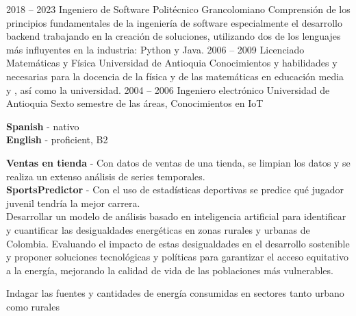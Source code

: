 \documentclass[9pt]{developercv} %
\begin{document}


\begin{entrylist}
	\entry
		{2018 -- 2023}
		{Ingeniero de Software}
		{Politécnico Grancolomiano}
		{Comprensión de los principios fundamentales de la ingeniería de software especialmente el desarrollo backend trabajando en la creación de soluciones, utilizando dos de los lenguajes más influyentes en la industria: Python y Java.}
	\entry
		{2006 -- 2009}
		{Licenciado Matemáticas y Física}
		{Universidad de Antioquia}
		{Conocimientos y habilidades y necesarias para la docencia de la física y de las matemáticas en educación media y , así como la universidad.  }
	\entry
		{2004 -- 2006}
		{Ingeniero electrónico}
		{Universidad de Antioquia }
		{Sexto semestre de las áreas, Conocimientos en IoT}
\end{entrylist}


\begin{minipage}[t]{0.4\textwidth}
	\vspace{-\baselineskip} %

	
	\textbf{Spanish} - nativo\\	
	\textbf{English} - proficient, B2\\
	
\end{minipage}
\hfill
\begin{minipage}[t]{0.4\textwidth}
	\vspace{-\baselineskip} %
	
	
	\textbf{Ventas en tienda} - Con datos de ventas de una tienda, se limpian los datos y se realiza un extenso análisis de series temporales. \\	
	
	\textbf{SportsPredictor} - Con el uso de estadísticas deportivas se predice qué jugador juvenil tendría la mejor carrera. \\
	
	Desarrollar un modelo de análisis basado en inteligencia artificial para identificar y cuantificar las desigualdades energéticas en zonas rurales y urbanas de Colombia. Evaluando el impacto de estas desigualdades en el desarrollo sostenible y proponer soluciones tecnológicas y políticas para garantizar el acceso equitativo a la energía, mejorando la calidad de vida de las poblaciones más vulnerables.
	
	Indagar las fuentes y cantidades de energía consumidas en sectores tanto urbano como rurales
	
\end{minipage}
\hfill

\end{document}
